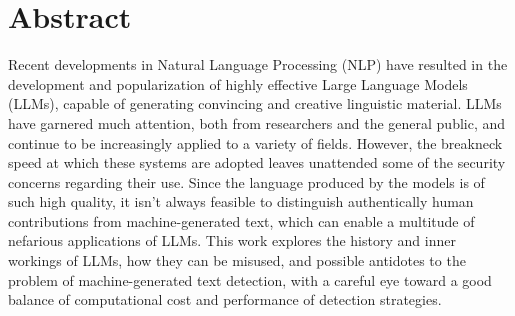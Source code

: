 \section*{Abstract}

Recent developments in Natural Language Processing (NLP) have resulted in the development and popularization of highly effective Large Language Models (LLMs), capable of generating convincing and creative linguistic material.
LLMs have garnered much attention, both from researchers and the general public, and continue to be increasingly applied to a variety of fields. However, the breakneck speed at which these systems are adopted leaves unattended some of the security concerns regarding their use.
Since the language produced by the models is of such high quality, it isn't always feasible to distinguish authentically human contributions from machine-generated text, which can enable a multitude of nefarious applications of LLMs.
This work explores the history and inner workings of LLMs, how they can be misused, and possible antidotes to the problem of machine-generated text detection, with a careful eye toward a good balance of computational cost and performance of detection strategies.
